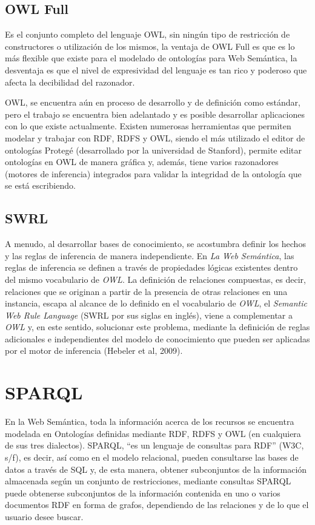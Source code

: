 \subsection{OWL Full}
Es el conjunto completo del lenguaje OWL, sin ningún tipo de restricción de constructores o utilización de los mismos, la ventaja de OWL Full es que es lo más flexible que existe para el modelado de ontologías para Web Semántica, la desventaja es que el nivel de expresividad del lenguaje es tan rico y poderoso que afecta la decibilidad del razonador.

OWL, se encuentra aún en proceso de desarrollo y de definición como estándar, pero el trabajo se encuentra bien adelantado y es posible desarrollar aplicaciones con lo que existe actualmente. Existen numerosas herramientas que permiten modelar y trabajar con RDF, RDFS y OWL, siendo el más utilizado el editor de ontologías Protegé (desarrollado por la universidad de Stanford), permite editar ontologías en OWL de manera gráfica y, además, tiene varios razonadores (motores de inferencia) integrados para validar la integridad de la ontología que se está escribiendo.

\subsection{SWRL}
A menudo, al desarrollar bases de conocimiento, se acostumbra definir los hechos y las reglas de inferencia de manera independiente. En \textit{La Web Semántica}, las reglas de inferencia se definen a través de propiedades lógicas existentes dentro del mismo vocabulario de \textit{OWL}. La definición de relaciones compuestas, es decir, relaciones que se originan a partir de la presencia de otras relaciones en una instancia, escapa al alcance de lo definido en el vocabulario de \textit{OWL}, el \textit{Semantic Web Rule Language} (SWRL por sus siglas en inglés), viene a complementar a \textit{OWL} y, en este sentido, solucionar este problema, mediante la definición de reglas adicionales e independientes del modelo de conocimiento que pueden ser aplicadas por el motor de inferencia (Hebeler et al, 2009).

\section{SPARQL}

En la Web Semántica, toda la información acerca de los recursos se encuentra modelada en Ontologías definidas mediante RDF, RDFS y OWL (en cualquiera de sus tres dialectos). SPARQL, ``es un lenguaje de consultas para RDF'' (W3C, s/f), es decir, así como en el modelo relacional, pueden consultarse las bases de datos a través de SQL y, de esta manera, obtener subconjuntos de la información almacenada según un conjunto de restricciones, mediante consultas SPARQL puede obtenerse subconjuntos de la información contenida en uno o varios documentos RDF en forma de grafos, dependiendo de las relaciones y de lo que el usuario desee buscar.

